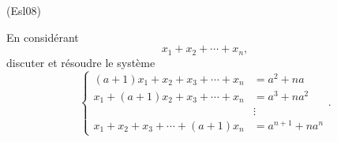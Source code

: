 \begin{tiny}(Esl08)\end{tiny} En considérant 
\[
  x_1+ x_2 + \cdots + x_n,
\]
discuter et résoudre le système
\[
\left\lbrace 
\begin{aligned}
  (a+1)x_1 + x_2 + x_3 + \cdots + x_n &= a^2 + na \\
  x_1 + (a+1)x_2 + x_3 + \cdots + x_n &= a^3 + na^2 \\
                                      &\vdots \\
  x_1 + x_2 + x_3 + \cdots + (a+1)x_n &= a^{n+1} + na^n
\end{aligned}
\right. .
\]
